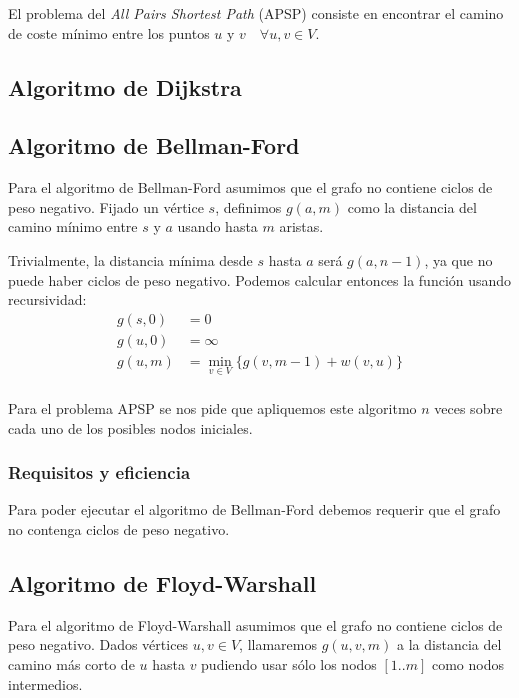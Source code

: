 \documentclass[a4paper, 11pt]{article} %
\begin{document}
    El problema del \textit{All Pairs Shortest Path} (APSP) consiste en encontrar el camino de coste mínimo entre los puntos $u$ y $v$ $\ \ \ \forall u,v \in V$.
  
  \subsection{Algoritmo de Dijkstra}
    
  
  \subsection{Algoritmo de Bellman-Ford}
    Para el algoritmo de Bellman-Ford asumimos que el grafo no contiene ciclos de peso negativo.
    Fijado un vértice $s$, definimos $g(a,m)$ como la distancia del camino mínimo entre $s$ y $a$
    usando hasta $m$ aristas.
    
    Trivialmente, la distancia mínima desde $s$ hasta $a$ será $g(a,n-1)$, ya que no puede
    haber ciclos de peso negativo. Podemos calcular entonces la función usando recursividad:
    \begin{equation} 
      \begin{split}
	g(s,0)  &=  0 \\
	g(u,0)  &=  \infty \\
	g(u,m)  &=  \min_{v \in V} \{g(v,m-1) + w(v,u)\} \\
      \end{split} 
    \end{equation}

    Para el problema APSP se nos pide que apliquemos este algoritmo $n$ veces sobre cada uno
    de los posibles nodos iniciales.
  
    \subsubsection{Requisitos y eficiencia}
      Para poder ejecutar el algoritmo de Bellman-Ford debemos requerir que el grafo
      no contenga ciclos de peso negativo.
      
      
      
  \subsection{Algoritmo de Floyd-Warshall}
    Para el algoritmo de Floyd-Warshall asumimos que el grafo no contiene ciclos de peso negativo.
    Dados vértices $u,v \in V$, llamaremos $g(u,v,m)$ a la distancia del camino más corto de $u$
    hasta $v$ pudiendo usar sólo los nodos $[1..m]$ como nodos intermedios.
    
\end{document}
